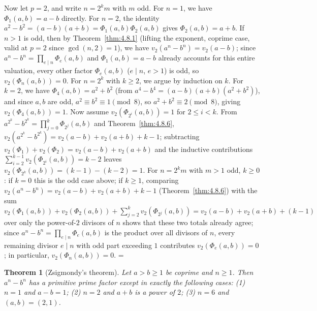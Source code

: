 \documentclass[11pt]{article}
\makeatletter
\theoremstyle{ntstyle}
\newtheorem{theorem}{Theorem}[subsection]
\let\nt@closedisplay\]
\def\nt@guardedclose{\@ifnextchar\par{\nt@closeafterpar}{\@ifnextchar\end{\postdisplaypenalty\@M\nt@closedisplay}{\nt@closedisplay}}}
\def\nt@closeafterpar\par{\@ifnextchar\par{\nt@closeafterpar}{\@ifnextchar\end{\postdisplaypenalty\@M\nt@closedisplay\par}{\nt@closedisplay\par}}}
\renewenvironment{proof}[1][\proofname]{\par
  \pushQED{\qed}\normalfont\topsep\medskipamount\edef\nt@afterproof{\@endparpenalty=\the\@endparpenalty\relax}\@beginparpenalty\@M\@endparpenalty\@M\let\]\nt@guardedclose\trivlist\item[]\textit{#1\@addpunct{.}} \ignorespaces}{\ifvmode\addpenalty\@M\fi\popQED\nt@afterproof\endtrivlist\@endpefalse}
\makeatother
\begin{document}
\begin{proof}
	Now let $p=2$, and write $n=2^km$ with $m$ odd.
	For $n=1$, we have $\Phi_1(a,b)=a-b$ directly. For $n=2$, the identity
	$a^{2}-b^{2}=(a-b)(a+b)=\Phi_1(a,b)\Phi_2(a,b)$ gives $\Phi_2(a,b)=a+b$.
	If $n>1$ is odd, then by Theorem~\ref{thm:4.8.1} (lifting the exponent, coprime case, valid at $p=2$
	since $\gcd(n, 2)=1$), we have $v_2(a^{n}-b^{n})=v_2(a-b)$; since
	$a^{n}-b^{n}=\prod_{e\mid n}\Phi_e(a,b)$ and $\Phi_1(a,b)=a-b$
	already accounts for this entire valuation, every other factor
	$\Phi_e(a,b)$ ($e\mid n$, $e>1$) is odd, so $v_2(\Phi_n(a,b))=0$. For
	$n=2^k$ with $k\ge2$, we argue by induction on $k$. For $k=2$,
	we have $\Phi_4(a,b)=a^{2}+b^{2}$ (from
	$a^{4}-b^{4}=(a-b)(a+b)(a^{2}+b^{2})$), and since $a,b$ are odd,
	$a^{2}\equiv b^{2}\equiv1\pmod{8}$, so $a^{2}+b^{2}\equiv2\pmod{8}$,
	giving $v_2(\Phi_4(a,b))=1$. Now assume
	$v_2(\Phi_{2^{i}}(a,b))=1$ for $2\le i<k$. From
	$a^{2^{k}}-b^{2^{k}}=\prod_{j=0}^{k}\Phi_{2^{j}}(a,b)$ and Theorem~\ref{thm:4.8.6},
	$v_2(a^{2^{k}}-b^{2^{k}})=v_2(a-b)+v_2(a+b)+k-1$; subtracting
	$v_2(\Phi_1)+v_2(\Phi_2)=v_2(a-b)+v_2(a+b)$ and the inductive
	contributions $\sum_{i=2}^{k-1}v_2(\Phi_{2^{i}}(a,b))=k-2$ leaves
	$v_2(\Phi_{2^{k}}(a,b))=(k-1)-(k-2)=1$. For $n=2^{k}m$ with $m>1$
	odd, $k\ge0$: if $k=0$ this is the odd case above; if $k\ge1$,
	comparing $v_2(a^{n}-b^{n})=v_2(a-b)+v_2(a+b)+k-1$ (Theorem~\ref{thm:4.8.6})
	with the sum
	$v_2(\Phi_1(a,b))+v_2(\Phi_2(a,b))+\sum_{j=2}^{k}v_2(\Phi_{2^{j}}(a,b))=v_2(a-b)+v_2(a+b)+(k-1)$
	over only the power-of-$2$ divisors of $n$ shows that these two totals
	already agree; since $a^{n}-b^{n}=\prod_{e\mid n}\Phi_e(a,b)$ is the
	product over all divisors of $n$, every remaining divisor $e\mid n$
	with odd part exceeding $1$ contributes $v_2(\Phi_e(a,b))=0$; in
	particular, $v_2(\Phi_n(a,b))=0$.
\end{proof}
\begin{theorem}[Zsigmondy's theorem]\label{thm:6.11.9} Let $a > b \ge 1$ be
	coprime and $n \ge 1$. Then $a^{n} - b^{n}$ has a primitive prime
	factor except in exactly the following cases: (1) $n = 1$ and $a - b = 1$; (2) $n = 2$
	and $a + b$ is a power of $2$; (3) $n = 6$ and $(a, b) = (2, 1)$.
\end{theorem}
\end{document}
